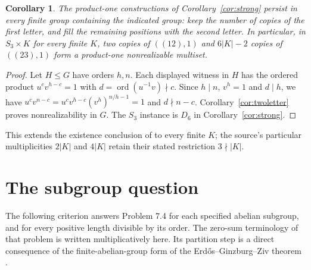 \documentclass[11pt]{article}
\newtheorem{corollary}[theorem]{Corollary}
\begin{document}
\begin{corollary}\label{cor:overgroup}
The product-one constructions of Corollary~\ref{cor:strong} persist
in every finite group containing the indicated group: keep the number
of copies of the first letter, and fill the remaining positions with
the second letter. In particular, in $S_3\times K$ for every finite $K$,
two copies of $((12),1)$ and $6|K|-2$ copies of $((23),1)$ form a
product-one nonrealizable multiset.
\end{corollary}
\begin{proof}
Let $H\leq G$ have orders $h,n$. Each displayed witness in $H$ has
the ordered product $u^c v^{h-c}=1$ with
$d=\operatorname{ord}(u^{-1}v)\nmid c$.
Since $h\mid n$, $v^h=1$ and $d\mid h$, we have
$u^c v^{n-c}=u^c v^{h-c}(v^h)^{n/h-1}=1$ and $d\nmid n-c$.
Corollary~\ref{cor:twoletter} proves nonrealizability in $G$.
The $S_3$ instance is $D_6$ in Corollary~\ref{cor:strong}.
\end{proof}
This extends the existence conclusion of \cite[Theorem 6.2]{Aliabadi}
to every finite $K$; the source's particular multiplicities
$2|K|$ and $4|K|$ retain their stated restriction $3\nmid|K|$.

\section{The subgroup question}
The following criterion answers Problem 7.4 for each specified abelian
subgroup, and for every positive length divisible by its order.
The zero-sum terminology of that problem is written multiplicatively here.
Its partition step is a direct consequence of the finite-abelian-group
form of the Erd\H{o}s--Ginzburg--Ziv theorem \cite[final paragraph]{EGZ}.
\end{document}
